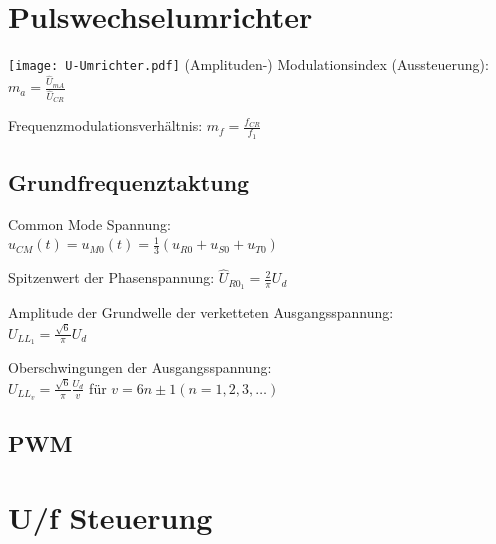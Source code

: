 \documentclass[fs, german]{latex4ei_fs}
\begin{document}
\section{Pulswechselumrichter}
\begin{sectionbox}

\texttt{[image: U-Umrichter.pdf]}
(Amplituden-) Modulationsindex (Aussteuerung): $m_a = \frac{\hat U_{mA}}{\hat U_{CR}}$

Frequenzmodulationsverhältnis: $m_f = \frac{f_{CR}}{f_1}$

\subsection{Grundfrequenztaktung}
Common Mode Spannung: \\
$u_{CM} (t) = u_{M0} (t) = \frac{1}{3} (u_{R0} + u_{S0} + u_{T0})$

Spitzenwert der Phasenspannung:
$\hat U_{R0_1} = \frac{2}{\pi} U_d$


Amplitude der Grundwelle der verketteten Ausgangsspannung: \\
$U_{LL_1} = \frac{\sqrt 6}{\pi} U_d$

Oberschwingungen der Ausgangsspannung: \\
$U_{LL_v} = \frac{\sqrt 6}{\pi} \frac{U_d}{v}$ für $v = 6n \pm 1 (n = 1, 2, 3, \ldots)$
\subsection{PWM}  
\end{sectionbox}

\section{U/f Steuerung}
\end{document}
